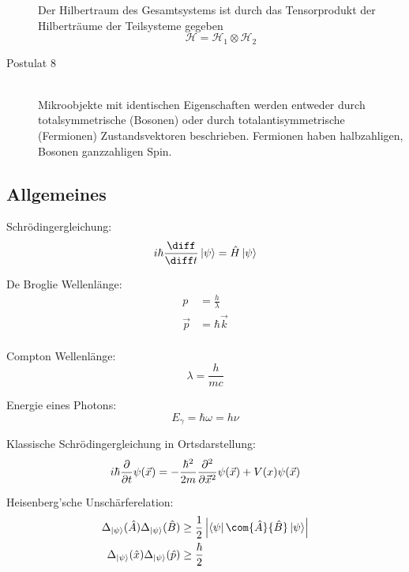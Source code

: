 \documentclass[11pt]{article}
\numberwithin{equation}{section}
\begin{document}
\begin{description}
          Der Hilbertraum des Gesamtsystems ist durch das Tensorprodukt der Hilberträume der Teilsysteme gegeben
          \begin{equation}
            \mathcal{H} = \mathcal{H}_1 \otimes \mathcal{H}_2
          \end{equation}
        \item[Postulat 8]\hfill \\
          Mikroobjekte mit identischen Eigenschaften werden entweder durch totalsymmetrische (Bosonen) oder durch totalantisymmetrische (Fermionen) Zustandsvektoren beschrieben. Fermionen haben halbzahligen, Bosonen ganzzahligen Spin.
      \end{description}

    \subsection{Allgemeines}
      Schrödingergleichung:
      \begin{equation}
        i\hbar\tder{}{t}\Ket{\psi} = \hat{H}\Ket{\psi}
      \end{equation}

      De Broglie Wellenlänge:
      \begin{equation}
        \begin{aligned}
          p &= \frac{h}{\lambda} \\
          \vec{p} &= \hbar \vec{k} \\
        \end{aligned}
      \end{equation}

      Compton Wellenlänge:
      \begin{equation}
        \lambda = \frac{h}{mc}
      \end{equation}

      Energie eines Photons:
      \begin{equation}
        E_\gamma = \hbar\omega = h\nu
      \end{equation}

      Klassische Schrödingergleichung in Ortsdarstellung:
      \begin{equation}
        i\hbar\frac{\partial }{\partial t}\psi(\vec{x}) = -\frac{\hbar^2}{2m}\frac{\partial^2}{\partial \vec{x}^2}\psi(\vec{x}) + V(x)\psi(\vec{x})
      \end{equation}

      Heisenberg'sche Unschärferelation:
      \begin{equation}
        \begin{aligned}
          \Delta_{\Ket{\psi}}(\hat{A}) \Delta_{\Ket{\psi}}(\hat{B}) &\ge
          \frac{1}{2} \left|\Bra{\psi} \com{\hat{A}}{\hat{B}} \Ket{\psi}\right| \\
          \Delta_{\Ket{\psi}}(\hat{x}) \Delta_{\Ket{\psi}}(\hat{p}) &\ge
          \frac{\hbar}{2}
        \end{aligned}
      \end{equation}
\end{document}
